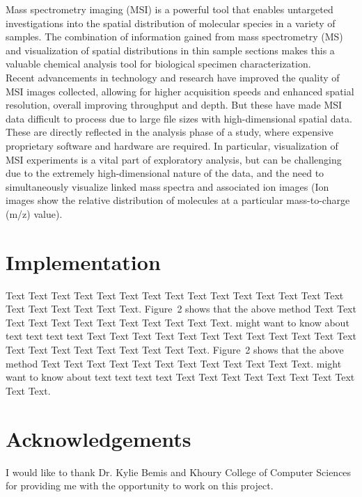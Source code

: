 \documentclass{bioinfo}
\begin{document}
Mass spectrometry imaging (MSI) is a powerful tool that enables untargeted investigations into the spatial distribution of molecular species in a variety of samples. The combination of information gained from mass spectrometry (MS) and visualization of spatial distributions in thin sample sections makes this a valuable chemical analysis tool for biological specimen characterization. \\
Recent advancements in technology and research have improved the quality of MSI images collected, allowing for higher acquisition speeds and enhanced spatial resolution, overall improving throughput and depth. But these have made MSI data difficult to process due to large file sizes with high-dimensional spatial data. These are directly reflected in the analysis phase of a study, where expensive proprietary software and hardware are required. In particular, visualization of MSI experiments is a vital part of exploratory analysis, but can be challenging due to the extremely high-dimensional nature of the data, and the need to simultaneously visualize linked mass spectra and associated ion images (Ion images show the relative distribution of molecules at a particular mass-to-charge (m/z) value). \\

\section{Implementation}

Text Text Text Text Text Text  Text Text Text Text Text Text Text
Text Text  Text Text Text Text Text Text.
Figure~2\vphantom{\ref{fig:02}} shows that the above method  Text
Text Text Text  Text Text Text Text Text Text  Text Text.
\citealp{Boffelli03} might want to know about  text text text text
Text Text Text Text Text Text  Text Text Text Text Text Text Text
Text Text  Text Text Text Text Text Text.
Figure~2\vphantom{\ref{fig:02}} shows that the above method  Text
Text Text Text  Text Text Text Text Text Text  Text Text.
\citealp{Boffelli03} might want to know about  text text text text
Text Text Text Text Text Text Text Text Text Text.

\section*{Acknowledgements}

I would like to thank Dr. Kylie Bemis and Khoury College of Computer Sciences for providing me with the opportunity 
to work on this project.
\end{document}
